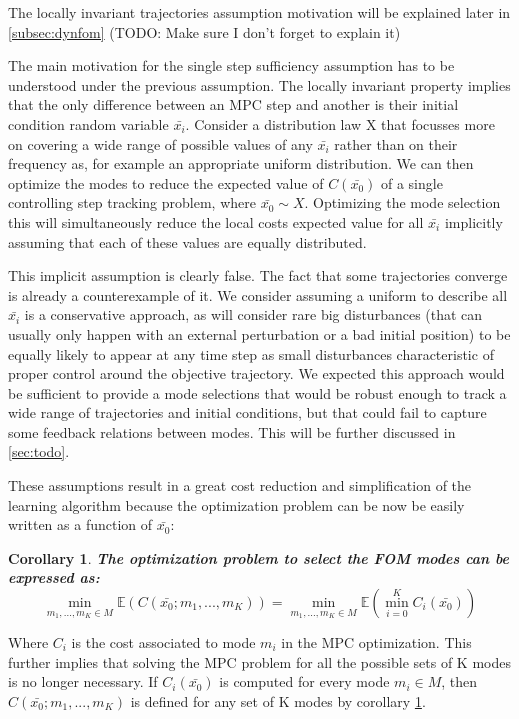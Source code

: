 \documentclass[12,twoside]{TFG-GM}
\newtheorem{corollary}[theorem]{Corollary}
\theoremstyle{definition}
\theoremstyle{remark}
\newcommand*\diff[1]{\bar{#1}}
\begin{document}
The locally invariant trajectories assumption motivation will be explained later in \ref{subsec:dynfom} (TODO: Make sure I don't forget to explain it)

The main motivation for the single step sufficiency assumption has to be understood under the previous assumption. The locally invariant property implies that the only difference between an MPC step and another is their initial condition random variable $\diff{x_i}$. Consider a distribution law X that focusses more on covering a wide range of possible values of any $\diff{x_i}$ rather than on their frequency as, for example an appropriate uniform distribution. We can then optimize the modes to reduce the expected value of $C(\diff{x_0})$ of a single controlling step tracking problem, where $\diff{x_0} \sim X$. Optimizing the mode selection this will simultaneously reduce the local costs expected value for all $\diff{x_i}$ implicitly assuming that each of these values are equally distributed.

This implicit assumption is clearly false. The fact that some trajectories converge is already a counterexample of it. We consider assuming a uniform to describe all $\diff{x_i}$ is a conservative approach, as will consider rare big disturbances (that can usually only happen with an external perturbation or a bad initial position) to be equally likely to appear at any time step as small disturbances characteristic of proper control around the objective trajectory. We expected this approach would be sufficient to provide a mode selections that would be robust enough to track a wide range of trajectories and initial conditions, but that could fail to capture some feedback relations between modes. This will be further discussed in \ref{sec:todo}.

These assumptions result in a great cost reduction and simplification of the learning algorithm because the optimization problem can be now be easily written as a function of $\diff{x_0}$:
\begin{corollary} \textbf{The optimization problem to select the FOM modes can be expressed as:} \label{cor:costfunction} 
 $$\min\limits_{m_1, ..., m_K \in M}\mathbb{E}(C(\diff{x_0}; m_1, ..., m_K)) = \min\limits_{m_1, ..., m_K \in M}\mathbb{E}(\min\limits_{i = 0}^{K}{C_i(\diff{x_0})})$$
 
\end{corollary}
Where $C_i$ is the cost associated to mode $m_i$ in the MPC optimization. This further implies that solving the MPC problem for all the possible sets of K modes is no longer necessary. If $C_i(\diff{x_0})$ is computed for every mode $m_i \in M$, then $C(\diff{x_0}; m_1, ..., m_K)$ is defined for any set of K modes by corollary \ref{cor:costfunction}.
\end{document}
